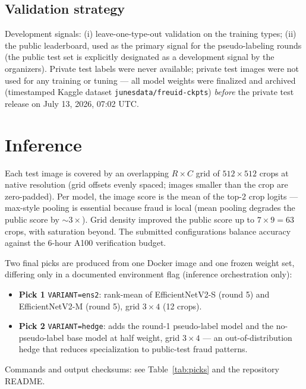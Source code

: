 \documentclass[11pt,a4paper]{article}
\begin{document}
\subsection{Validation strategy}
Development signals: (i) leave-one-type-out validation on the training types;
(ii) the public leaderboard, used as the primary signal for the pseudo-labeling
rounds (the public test set is explicitly designated as a development signal by the
organizers). Private test labels were never available; private test images were not
used for any training or tuning --- all model weights were finalized and archived
(timestamped Kaggle dataset \texttt{junesdata/freuid-ckpts}) \emph{before} the private
test release on July 13, 2026, 07:02 UTC.

\section{Inference}
\label{sec:inference}
Each test image is covered by an overlapping $R\times C$ grid of $512\times512$ crops
at native resolution (grid offsets evenly spaced; images smaller than the crop are
zero-padded). Per model, the image score is the mean of the top-2 crop logits ---
max-style pooling is essential because fraud is local (mean pooling degrades the
public score by $\sim3\times$). Grid density improved the public score up to
$7{\times}9=63$ crops, with saturation beyond. The submitted configurations balance
accuracy against the 6-hour A100 verification budget.

Two final picks are produced from one Docker image and one frozen weight set,
differing only in a documented environment flag (inference orchestration only):
\begin{itemize}[noitemsep]
  \item \textbf{Pick 1} \texttt{VARIANT=ens2}: rank-mean of EfficientNetV2-S (round 5)
        and EfficientNetV2-M (round 5), grid $3{\times}4$ (12 crops).
  \item \textbf{Pick 2} \texttt{VARIANT=hedge}: adds the round-1 pseudo-label model and
        the no-pseudo-label base model at half weight, grid $3{\times}4$ ---
        an out-of-distribution hedge that reduces specialization to public-test fraud
        patterns.
\end{itemize}
Commands and output checksums: see Table~\ref{tab:picks} and the repository README.
\end{document}
